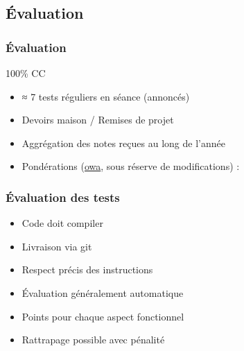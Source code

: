 \documentclass[english, french]{beamer}
\begin{document}
\subsection{Évaluation}
\begin{frame}
	\frametitle{Évaluation}
	100\% CC
	\begin{itemize}
		\item ≈ 7 tests réguliers en séance (annoncés)
		\item Devoirs maison / Remises de projet
		\item Aggrégation des notes reçues au long de l’année
		\item 
    Pondérations {\tiny (\og{}\href{https://en.wikipedia.org/wiki/Ordered_weighted_averaging}{owa}\fg, sous réserve de modifications)} :
  \end{itemize}
\end{frame}

\begin{frame}
	\frametitle{Évaluation des tests}
	\begin{itemize}
		\item Code doit compiler
		\item Livraison via git
		\item Respect précis des instructions
		\item Évaluation généralement automatique
		\item Points pour chaque aspect fonctionnel
		\item Rattrapage possible avec pénalité
	\end{itemize}
\end{frame}
\end{document}
